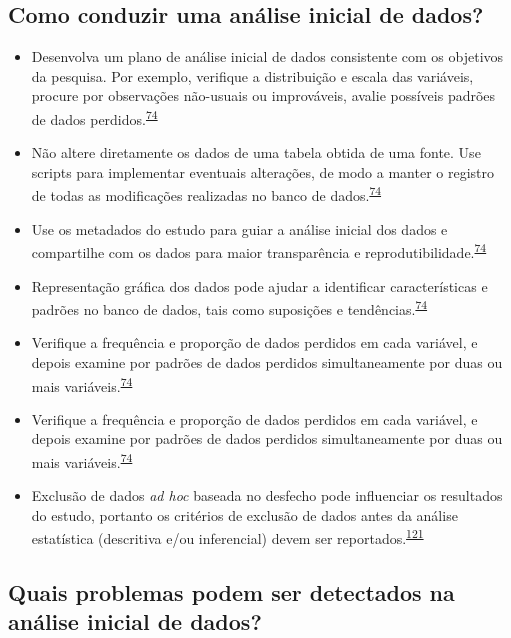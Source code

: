 \documentclass[
  a4paper,
]{book}
\begin{document}
\hypertarget{como-conduzir-uma-anuxe1lise-inicial-de-dados}{%
\subsection{Como conduzir uma análise inicial de dados?}\label{como-conduzir-uma-anuxe1lise-inicial-de-dados}}

\begin{itemize}
\item
  Desenvolva um plano de análise inicial de dados consistente com os objetivos da pesquisa. Por exemplo, verifique a distribuição e escala das variáveis, procure por observações não-usuais ou improváveis, avalie possíveis padrões de dados perdidos.\textsuperscript{\protect\hyperlink{ref-Baillie2022}{74}}
\item
  Não altere diretamente os dados de uma tabela obtida de uma fonte. Use scripts para implementar eventuais alterações, de modo a manter o registro de todas as modificações realizadas no banco de dados.\textsuperscript{\protect\hyperlink{ref-Baillie2022}{74}}
\item
  Use os metadados do estudo para guiar a análise inicial dos dados e compartilhe com os dados para maior transparência e reprodutibilidade.\textsuperscript{\protect\hyperlink{ref-Baillie2022}{74}}
\item
  Representação gráfica dos dados pode ajudar a identificar características e padrões no banco de dados, tais como suposições e tendências.\textsuperscript{\protect\hyperlink{ref-Baillie2022}{74}}
\item
  Verifique a frequência e proporção de dados perdidos em cada variável, e depois examine por padrões de dados perdidos simultaneamente por duas ou mais variáveis.\textsuperscript{\protect\hyperlink{ref-Baillie2022}{74}}
\item
  Verifique a frequência e proporção de dados perdidos em cada variável, e depois examine por padrões de dados perdidos simultaneamente por duas ou mais variáveis.\textsuperscript{\protect\hyperlink{ref-Baillie2022}{74}}
\item
  Exclusão de dados \emph{ad hoc} baseada no desfecho pode influenciar os resultados do estudo, portanto os critérios de exclusão de dados antes da análise estatística (descritiva e/ou inferencial) devem ser reportados.\textsuperscript{\protect\hyperlink{ref-Landis2012}{121}}
\end{itemize}

\hypertarget{quais-problemas-podem-ser-detectados-na-anuxe1lise-inicial-de-dados}{%
\subsection{Quais problemas podem ser detectados na análise inicial de dados?}\label{quais-problemas-podem-ser-detectados-na-anuxe1lise-inicial-de-dados}}
\end{document}
